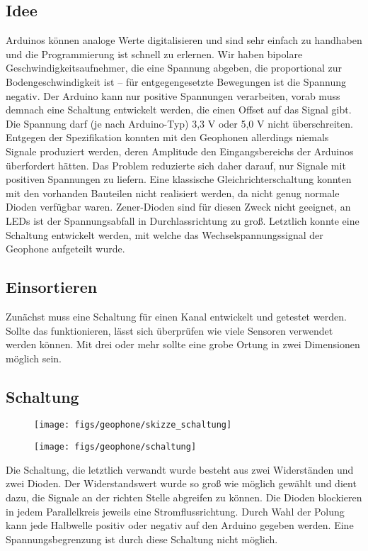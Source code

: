 \subsection{Idee}
Arduinos können analoge Werte digitalisieren und sind sehr einfach zu handhaben und die Programmierung ist schnell zu erlernen. Wir haben bipolare Geschwindigkeitsaufnehmer, die eine Spannung abgeben, die proportional zur Bodengeschwindigkeit ist -- für entgegengesetzte Bewegungen ist die Spannung negativ. Der Arduino kann nur positive Spannungen verarbeiten, vorab muss demnach eine Schaltung entwickelt werden, die einen Offset auf das Signal gibt. Die Spannung darf (je nach Arduino-Typ)  3,3 V oder 5,0 V nicht überschreiten. Entgegen der Spezifikation konnten mit den Geophonen allerdings niemals Signale produziert werden, deren Amplitude den Eingangsbereichs der Arduinos überfordert hätten. Das Problem reduzierte sich daher darauf, nur Signale mit positiven Spannungen zu liefern. Eine klassische Gleichrichterschaltung konnten mit den vorhanden Bauteilen nicht realisiert werden, da nicht genug normale Dioden verfügbar waren. Zener-Dioden sind für diesen Zweck nicht geeignet, an LEDs ist der Spannungsabfall in Durchlassrichtung zu groß. Letztlich konnte eine Schaltung entwickelt werden, mit welche das Wechselspannungssignal der Geophone aufgeteilt wurde. 

\subsection{Einsortieren}
Zunächst muss eine Schaltung für einen Kanal entwickelt und getestet werden. Sollte das funktionieren, lässt sich überprüfen wie viele Sensoren verwendet werden können. Mit drei oder mehr sollte eine grobe Ortung in zwei Dimensionen möglich sein.

\subsection{Schaltung}
\begin{figure}
\centering
\texttt{[image: figs/geophone/skizze\_schaltung]}
\end{figure}

\begin{figure}
\centering
\texttt{[image: figs/geophone/schaltung]}
\end{figure}

Die Schaltung, die letztlich verwandt wurde besteht aus zwei Widerständen und zwei Dioden. Der Widerstandswert wurde so groß wie möglich gewählt und dient dazu, die Signale an der richten Stelle abgreifen zu können. Die Dioden blockieren in jedem Parallelkreis jeweils eine Stromflussrichtung. Durch Wahl der Polung kann jede Halbwelle positiv oder negativ auf den Arduino gegeben werden. Eine Spannungsbegrenzung ist durch diese Schaltung nicht möglich.

